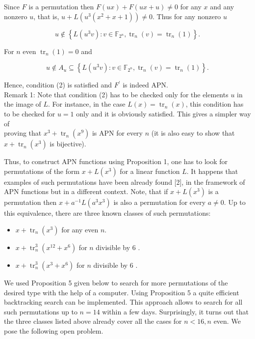 \documentclass[10pt]{article}
\begin{document}
Since $F$ is a permutation then $F(u x)+F(u x+u) \neq 0$ for any $x$ and any nonzero $u$, that is, $u+L\left(u^{3}\left(x^{2}+x+1\right)\right) \neq 0$. Thus for any nonzero $u$


\begin{equation*}
u \notin\left\{L\left(u^{3} v\right): v \in \mathbb{F}_{2^{n}}, \operatorname{tr}_{n}(v)=\operatorname{tr}_{n}(1)\right\} . \tag{3}
\end{equation*}


For $n$ even $\operatorname{tr}_{n}(1)=0$ and

$$
u \notin A_{u} \subseteq\left\{L\left(u^{3} v\right): v \in \mathbb{F}_{2^{n}}, \operatorname{tr}_{n}(v)=\operatorname{tr}_{n}(1)\right\} .
$$

Hence, condition (2) is satisfied and $F^{\prime}$ is indeed APN.\\
Remark 1: Note that condition (2) has to be checked only for the elements $u$ in the image of $L$. For instance, in the case $L(x)=\operatorname{tr}_{n}(x)$, this condition has to be checked for $u=1$ only and it is obviously satisfied. This gives a simpler way of\\
proving that $x^{3}+\operatorname{tr}_{n}\left(x^{9}\right)$ is APN for every $n$ (it is also easy to show that $x+\operatorname{tr}_{n}\left(x^{3}\right)$ is bijective).

Thus, to construct APN functions using Proposition 1, one has to look for permutations of the form $x+L\left(x^{3}\right)$ for a linear function $L$. It happens that examples of such permutations have been already found [2], in the framework of APN functions but in a different context. Note, that if $x+L\left(x^{3}\right)$ is a permutation then $x+a^{-1} L\left(a^{3} x^{3}\right)$ is also a permutation for every $a \neq 0$. Up to this equivalence, there are three known classes of such permutations:

\begin{itemize}
  \item $x+\operatorname{tr}_{n}\left(x^{3}\right)$ for any even $n$.
  \item $x+\operatorname{tr}_{n}^{3}\left(x^{12}+x^{6}\right)$ for $n$ divisible by 6 .
  \item $x+\operatorname{tr}_{n}^{3}\left(x^{3}+x^{6}\right)$ for $n$ divisible by 6 .
\end{itemize}

We used Proposition 5 given below to search for more permutations of the desired type with the help of a computer. Using Proposition 5 a quite efficient backtracking search can be implemented. This approach allows to search for all such permutations up to $n=14$ within a few days. Surprisingly, it turns out that the three classes listed above already cover all the cases for $n<16, n$ even. We pose the following open problem.
\end{document}
